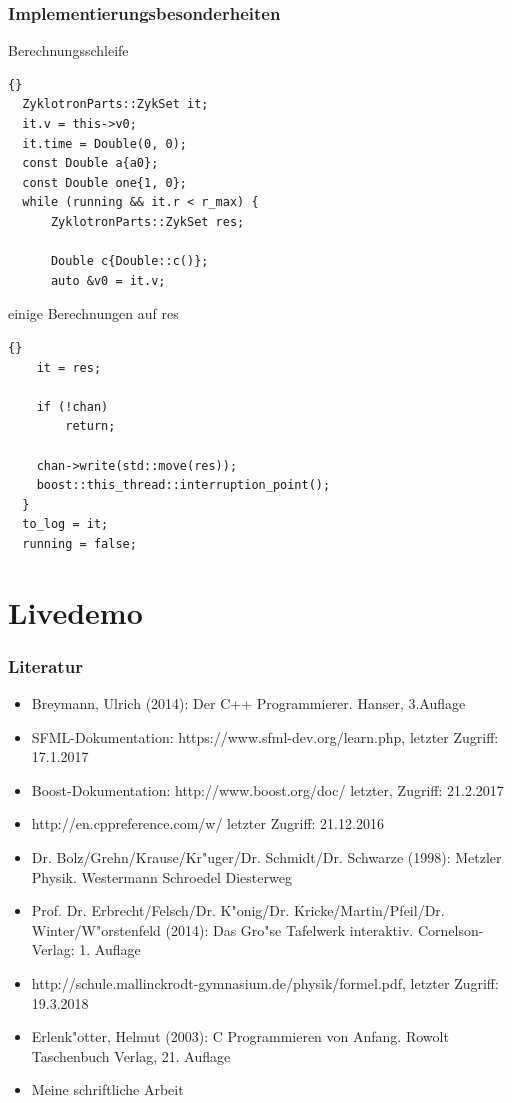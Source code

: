 \documentclass{beamer}
\begin{document}
\begin{frame}[fragile]
\frametitle{Implementierungsbesonderheiten}
\begin{block}{Berechnungsschleife}
  \begin{lstlisting}{}
  ZyklotronParts::ZykSet it;
  it.v = this->v0;
  it.time = Double(0, 0);
  const Double a{a0};
  const Double one{1, 0};
  while (running && it.r < r_max) {
      ZyklotronParts::ZykSet res;

      Double c{Double::c()};
      auto &v0 = it.v;

  \end{lstlisting}
  einige Berechnungen auf res
  \begin{lstlisting}{}
    it = res;

    if (!chan)
        return;

    chan->write(std::move(res));
    boost::this_thread::interruption_point();
  }
  to_log = it;
  running = false;
  \end{lstlisting}
\end{block}
\end{frame}


\section{Livedemo}

\frame{\tableofcontents[currentsection]}

\begin{frame}
\frametitle{Literatur}
\begin{itemize}

\item Breymann, Ulrich (2014): Der C++ Programmierer. Hanser, 3.Auflage
\item SFML-Dokumentation: https://www.sfml-dev.org/learn.php, letzter Zugriff: 17.1.2017
\item Boost-Dokumentation: http://www.boost.org/doc/ letzter, Zugriff: 21.2.2017
\item http://en.cppreference.com/w/ letzter Zugriff: 21.12.2016
\item Dr. Bolz/Grehn/Krause/Kr"uger/Dr. Schmidt/Dr. Schwarze (1998): Metzler Physik. Westermann Schroedel Diesterweg
\item Prof. Dr. Erbrecht/Felsch/Dr. K"onig/Dr. Kricke/Martin/Pfeil/Dr. Winter/W"orstenfeld (2014): Das Gro"se Tafelwerk interaktiv. Cornelson-Verlag: 1. Auflage
\item http://schule.mallinckrodt-gymnasium.de/physik/formel.pdf, letzter Zugriff: 19.3.2018
\item Erlenk"otter, Helmut (2003): C Programmieren von Anfang. Rowolt Taschenbuch Verlag, 21. Auflage
\item Meine schriftliche Arbeit
\end{itemize}

\end{frame}
\end{document}
